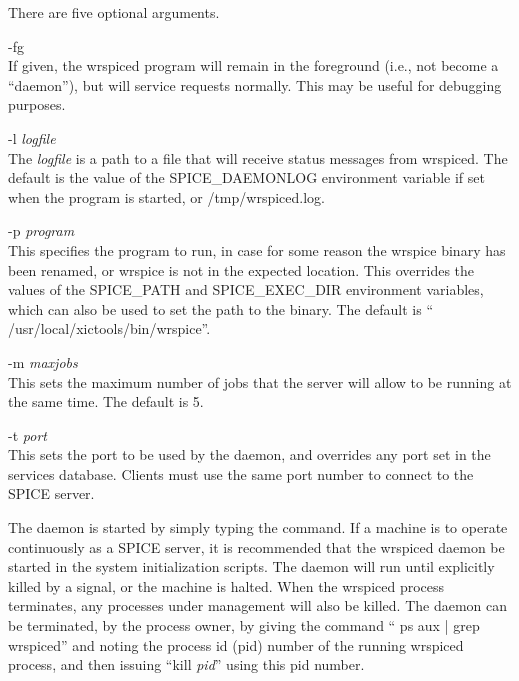 There are five optional arguments.
\begin{description}
\item{\vt -fg}\\
If given, the {\vt wrspiced} program will remain in the foreground
(i.e., not become a ``daemon''), but will service requests normally. 
This may be useful for debugging purposes.

\item{{\vt -l} {\it logfile}}\\
The {\it logfile} is a path to a file that will receive status
messages from {\vt wrspiced}.  The default is the value of the {\et
SPICE\_DAEMONLOG} environment variable if set when the program is
started, or {\vt /tmp/wrspiced.log}.

\item{{\vt -p} {\it program}}\\
This specifies the {\WRspice} program to run, in case for some reason
the {\vt wrspice} binary has been renamed, or {\vt wrspice} is not in
the expected location.  This overrides the values of the {\et
SPICE\_PATH} and {\et SPICE\_EXEC\_DIR} environment variables, which
can also be used to set the path to the binary.  The default is ``{\vt
/usr/local/xictools/bin/wrspice}''.

\item{{\vt -m} {\it maxjobs}}\\
This sets the maximum number of jobs that the server will allow to be
running at the same time.  The default is 5.

\item{{\vt -t} {\it port}}\\
This sets the port to be used by the daemon, and overrides any port
set in the services database.  Clients must use the same port number
to connect to the SPICE server.
\end{description}

The daemon is started by simply typing the command.  If a machine is
to operate continuously as a SPICE server, it is recommended that the
{\vt wrspiced} daemon be started in the system initialization scripts. 
The daemon will run until explicitly killed by a signal, or the
machine is halted.  When the {\vt wrspiced} process terminates, any
{\WRspice} processes under management will also be killed.  The daemon
can be terminated, by the process owner, by giving the command ``{\vt
ps aux | grep wrspiced}'' and noting the process id (pid) number of
the running {\vt wrspiced} process, and then issuing ``{\vt kill} {\it
pid\/}'' using this pid number.

